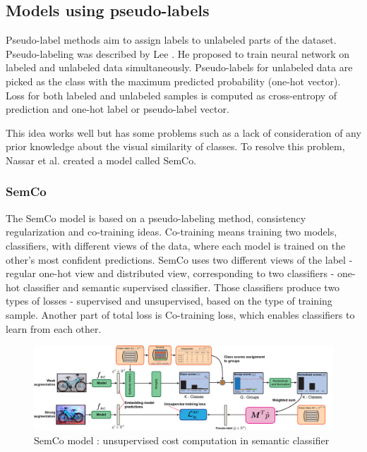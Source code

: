 \subsection{Models using pseudo-labels}
Pseudo-label methods aim to assign labels to unlabeled parts of the dataset. Pseudo-labeling was described by Lee \cite{lee2013}. He proposed to train neural network on labeled and unlabeled data simultaneously. Pseudo-labels for unlabeled data are picked as the class with the maximum predicted probability (one-hot vector). Loss for both labeled and unlabeled samples is computed as cross-entropy of prediction and one-hot label or pseudo-label vector.

This idea works well but has some problems such as a lack of consideration of any prior knowledge about the visual similarity of classes. To resolve this problem, Nassar et al. \cite{nassar} created a model called SemCo. 

\subsubsection{SemCo}
The SemCo model is based on a pseudo-labeling method, consistency regularization and co-training ideas. Co-training means training two models, classifiers, with different views of the data, where each model is trained on the other’s most confident predictions. SemCo uses two different views of the label - regular one-hot view and distributed view, corresponding to two classifiers - one-hot classifier and semantic supervised classifier. Those classifiers produce two types of losses - supervised and unsupervised, based on the type of training sample. Another part of total loss is Co-training loss, which enables classifiers to learn from each other. \cite{nassar}


\begin{figure}[h!]
    \centering
    \includegraphics[width=1\linewidth]{figs/semco_unlabelled_loss_precedure.png}
    \caption{SemCo model : unsupervised cost computation in semantic classifier \cite{nassar}}
    \label{fig:semco}
\end{figure}

